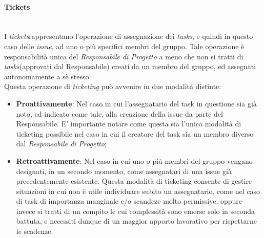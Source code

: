 \paragraph{Tickets} ~\\
	I \textit{tickets}\glossario rappresentano l'operazione di assegnazione dei \textit{tasks}\glossario, e quindi in questo caso delle \textit{issue}\glossario, ad uno o più specifici membri del gruppo. Tale operazione è responsabilità unica del \textit{Responsabile di Progetto} a meno che non si tratti di \textit{tasks}\glossario (approvati dal Responsabile) creati da un membro del gruppo, ed assegnati autonomamente a sè stesso.\\
	Questa operazione di \textit{ticketing} può avvenire in due modalità distinte:
	\begin{itemize}
	\item \textbf{Proattivamente}: Nel caso in cui l'assegnatario del task in questione sia già noto, ed indicato come tale, alla creazione della issue da parte del Responsabile. E' importante notare come questa sia l'unica modalità di ticketing possibile nel caso in cui il creatore del task sia un membro diverso dal \textit{Responsabile di Progetto};
	\item \textbf{Retroattivamente}: Nel caso in cui uno o più membri del gruppo vengano designati, in un secondo momento, come assegnatari di una issue già precedentemente esistente. Questa modalità di ticketing consente di gestire situazioni in cui non è utile individuare subito un assegnatario, come nel caso di task di importanza manginale e/o scandeze molto permissive, oppure invece si tratti di un compito le cui complessità sono emerse solo in seconda battuta, e necessiti dunque di un maggior apporto lavorativo per rispettarne le scadenze.
	\end{itemize}
